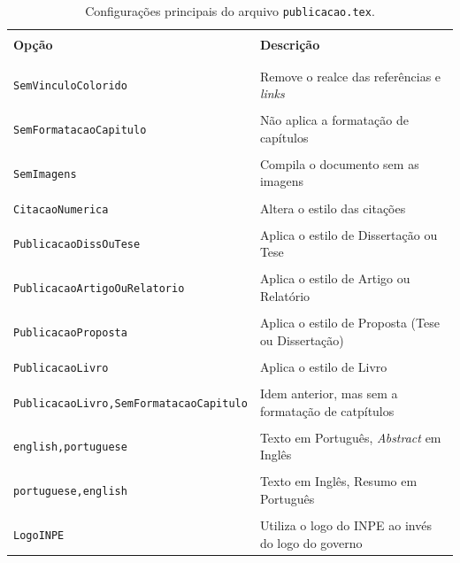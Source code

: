 \begin{table}[H]
\centering
\caption{Configurações principais do arquivo {\tt publicacao.tex}.}
\label{tab:arq_publicacao}
    \begin{tabular}{p{5cm}p{8cm}}
    \hline
    \\[-0.5em]
    \textbf{Opção} & \textbf{Descrição} \\
    \\[-0.5em]
    \hline
    \hline
    \\[-0.5em]
    {\tt SemVinculoColorido}                    & Remove o realce das referências e \textit{links} \\
    \\[-0.5em]
    {\tt SemFormatacaoCapitulo}                 & Não aplica a formatação de capítulos  \\
    \\[-0.5em]
    {\tt SemImagens}                            & Compila o documento sem as imagens \\
    \\[-0.5em]
    {\tt CitacaoNumerica}                       & Altera o estilo das citações \\
    \\[-0.5em]
    {\tt PublicacaoDissOuTese}                  & Aplica o estilo de Dissertação ou Tese \\
    \\[-0.5em]
    {\tt PublicacaoArtigoOuRelatorio}           & Aplica o estilo de Artigo ou Relatório \\
    \\[-0.5em]
    {\tt PublicacaoProposta}                    & Aplica o estilo de Proposta (Tese ou Dissertação) \\
    \\[-0.5em]
    {\tt PublicacaoLivro}                       & Aplica o estilo de Livro \\
    \\[-0.5em]
    {\tt PublicacaoLivro,SemFormatacaoCapitulo} & Idem anterior, mas sem a formatação de catpítulos \\
    \\[-0.5em]
    {\tt english,portuguese}                    & Texto em Português, \textit{Abstract} em Inglês \\
    \\[-0.5em]
    {\tt portuguese,english}                    & Texto em Inglês, Resumo em Português \\
    \\[-0.5em]
    {\tt LogoINPE}                              & Utiliza o logo do INPE ao invés do logo do governo \\

\end{tabular}
\end{table}
